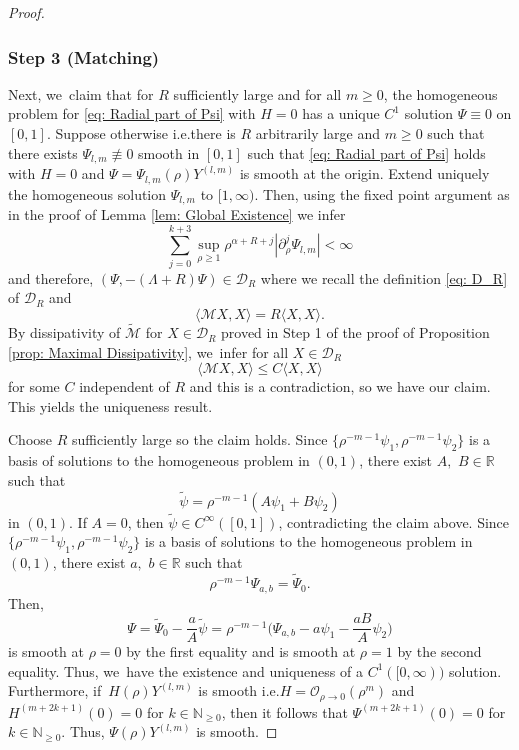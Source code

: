 \documentclass[10pt]{article}
\newcommand{\ie}{i.e.}
\theoremstyle{plain}
\theoremstyle{definition}
\begin{document}
\begin{proof}
\subsubsection*{Step 3 (Matching)}
Next, we~claim that for $R$ sufficiently large and for all $m\ge0$, the homogeneous problem for \eqref{eq: Radial part of Psi} with $H=0$ has a unique $C^1$ solution $\Psi\equiv0$ on $[0,1]$. Suppose otherwise \ie there is $R$ arbitrarily large and $m\ge0$ such that there exists $\Psi_{l,m}\not\equiv 0$ smooth in $[0,1]$ such that \eqref{eq: Radial part of Psi} holds with $H=0$ and $\Psi=\Psi_{l,m}(\rho)Y^{(l,m)}$ is smooth at the origin. Extend uniquely the homogeneous solution $\Psi_{l,m}$ to $[1,\infty)$. Then, using the fixed point argument as in the proof of Lemma \ref{lem: Global Existence} we infer
\[
\sum_{j=0}^{k+3}{}\sup_{\rho\ge1}\rho^{\alpha+R+j}|\partial_
\rho^j\Psi_{l,m}|<\infty
\]
and therefore, $(\Psi,-(\Lambda+R)\Psi)\in \mathcal D_R$ where we recall the definition \eqref{eq: D_R} of $\mathcal D_R$ and
\[
\langle \mathcal MX,X\rangle=R\langle X,X\rangle.
\]
By dissipativity of $\tilde{\mathcal M}$ for $X\in \mathcal D_R$ proved in Step 1 of the proof of Proposition \ref{prop: Maximal Dissipativity}, we~infer for all $X\in \mathcal D_R$
\[
\langle \mathcal M X,X\rangle\le C \langle X,X\rangle
\]
for some $C$ independent of $R$ and this is a contradiction, so we have our claim. This yields the uniqueness result.

Choose $R$ sufficiently large so the claim holds. Since $\{\rho^{-m-1}\psi_1,\rho^{-m-1}\psi_2\}$ is a basis of solutions to the homogeneous problem in $(0,1)$, there exist $A,$ $B\in\mathbb R$ such that
\[
\tilde\psi=\rho^{-m-1}(A\psi_1+B\psi_2)
\]
in $(0,1)$. If $A=0$, then $\tilde \psi\in C^\infty([0,1])$, contradicting the claim above. Since $\{\rho^{-m-1}\psi_1,\rho^{-m-1}\psi_2\}$ is a basis of solutions to the homogeneous problem in $(0,1)$, there exist $a,$ $b\in\mathbb R$ such that
\[
\rho^{-m-1}\Psi_{a,b}=\tilde \Psi_0.
\]
Then,
\[
\Psi=\tilde \Psi_0-\frac{a}{A}\tilde\psi=\rho^{-m-1} \Big(\Psi_{a,b}-a\psi_1-\frac{aB}{A}\psi_2 \Big)
\]
is smooth at $\rho=0$ by the first equality and is smooth at $\rho=1$ by the second equality. Thus, we~have the existence and uniqueness of a $C^1([0,\infty))$ solution. Furthermore, if~$H(\rho)Y^{(l,m)}$ is smooth \ie $H=\mathcal O_{\rho\to 0}(\rho^m)$ and $H^{(m+2k+1)}(0)=0$ for $k\in\mathbb N_{\ge 0}$, then it follows that $\Psi^{(m+2k+1)}(0)=0$ for $k\in\mathbb N_{\ge 0}$. Thus, $\Psi(\rho)Y^{(l,m)}$ is smooth.
\end{proof}
\end{document}
